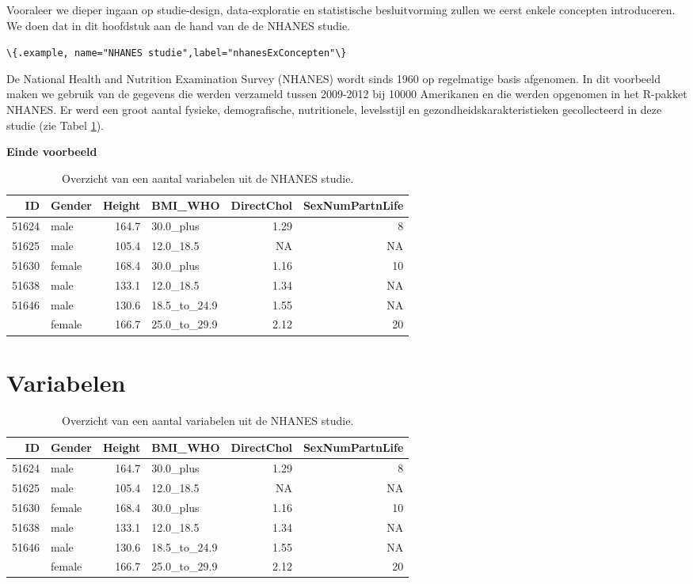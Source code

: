 \documentclass[
  12pt,dutch,coursenotes]{book}
\newcommand{\passthrough}[1]{#1}
\begin{document}
Vooraleer we dieper ingaan op studie-design, data-exploratie en statistische besluitvorming zullen we eerst enkele concepten introduceren.
We doen dat in dit hoofdstuk aan de hand van de de NHANES studie.

\passthrough{\lstinline!\{.example, name="NHANES studie",label="nhanesExConcepten"\}!}

De National Health and Nutrition Examination Survey
(NHANES) wordt sinds 1960 op regelmatige basis afgenomen. In dit voorbeeld maken we gebruik van de gegevens die werden verzameld tussen 2009-2012 bij 10000 Amerikanen en die werden opgenomen in het R-pakket NHANES. Er werd een groot aantal fysieke, demografische, nutritionele, levelsstijl en gezondheidskarakteristieken gecollecteerd in deze studie (zie Tabel \ref{tab:nhanesConcepten}).

\textbf{Einde voorbeeld}

\begin{table}

\caption{\label{tab:nhanesConcepten}Overzicht van een aantal variabelen uit de NHANES studie.}
\centering
\begin{tabular}[t]{rlrlrr}
\toprule
ID & Gender & Height & BMI\_WHO & DirectChol & SexNumPartnLife\\
\midrule
51624 & male & 164.7 & 30.0\_plus & 1.29 & 8\\
51625 & male & 105.4 & 12.0\_18.5 & NA & NA\\
51630 & female & 168.4 & 30.0\_plus & 1.16 & 10\\
51638 & male & 133.1 & 12.0\_18.5 & 1.34 & NA\\
51646 & male & 130.6 & 18.5\_to\_24.9 & 1.55 & NA\\
\addlinespace
51647 & female & 166.7 & 25.0\_to\_29.9 & 2.12 & 20\\
\bottomrule
\end{tabular}
\end{table}

\hypertarget{variabelen}{%
\section{Variabelen}\label{variabelen}}

\begin{table}

\caption{\label{tab:nhanesConcepten2}Overzicht van een aantal variabelen uit de NHANES studie.}
\centering
\begin{tabular}[t]{rlrlrr}
\toprule
ID & Gender & Height & BMI\_WHO & DirectChol & SexNumPartnLife\\
\midrule
51624 & male & 164.7 & 30.0\_plus & 1.29 & 8\\
51625 & male & 105.4 & 12.0\_18.5 & NA & NA\\
51630 & female & 168.4 & 30.0\_plus & 1.16 & 10\\
51638 & male & 133.1 & 12.0\_18.5 & 1.34 & NA\\
51646 & male & 130.6 & 18.5\_to\_24.9 & 1.55 & NA\\
\addlinespace
51647 & female & 166.7 & 25.0\_to\_29.9 & 2.12 & 20\\
\bottomrule
\end{tabular}
\end{table}
\end{document}
